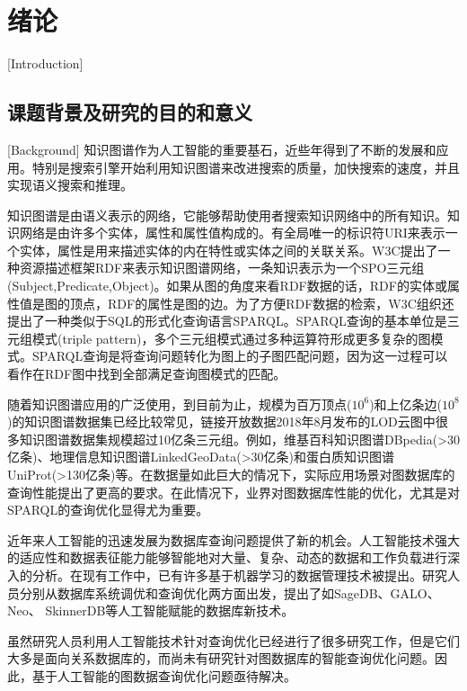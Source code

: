 
\chapter{绪论}[Introduction]

\section{课题背景及研究的目的和意义}[Background]
知识图谱作为人工智能的重要基石，近些年得到了不断的发展和应用。特别是搜索引擎开始利用知识图谱来改进搜索的质量，加快搜索的速度，并且实现语义搜索和推理。

知识图谱是由语义表示的网络，它能够帮助使用者搜索知识网络中的所有知识。知识网络是由许多个实体，属性和属性值构成的。有全局唯一的标识符URI来表示一个实体，属性是用来描述实体的内在特性或实体之间的关联关系。W3C提出了一种资源描述框架RDF\cite{rdf}来表示知识图谱网络，一条知识表示为一个SPO三元组(Subject,Predicate,Object)。如果从图的角度来看RDF数据的话，RDF的实体或属性值是图的顶点，RDF的属性是图的边。为了方便RDF数据的检索，W3C组织还提出了一种类似于SQL的形式化查询语言SPARQL\cite{sparql}。SPARQL查询的基本单位是三元组模式(triple pattern)，多个三元组模式通过多种运算符形成更多复杂的图模式。SPARQL查询是将查询问题转化为图上的子图匹配问题，因为这一过程可以看作在RDF图中找到全部满足查询图模式的匹配。

随着知识图谱应用的广泛使用，到目前为止，规模为百万顶点($10^6$)和上亿条边($10^8$)的知识图谱数据集已经比较常见\cite{MassiveData}，链接开放数据2018年8月发布的LOD云图中很多知识图谱数据集规模超过10亿条三元组。例如，维基百科知识图谱DBpedia(>30亿条)、地理信息知识图谱LinkedGeoData(>30亿条)和蛋白质知识图谱UniProt(>130亿条)等。在数据量如此巨大的情况下，实际应用场景对图数据库的查询性能提出了更高的要求。在此情况下，业界对图数据库性能的优化，尤其是对SPARQL的查询优化显得尤为重要。

近年来人工智能的迅速发展为数据库查询问题提供了新的机会\cite{MLforDB}。人工智能技术强大的适应性和数据表征能力能够智能地对大量、复杂、动态的数据和工作负载进行深入的分析。在现有工作中，已有许多基于机器学习的数据管理技术被提出。研究人员分别从数据库系统调优和查询优化两方面出发，提出了如SageDB\cite{SageDB}、GALO\cite{GALO}、Neo\cite{Neo}、
SkinnerDB\cite{SkinnerDB}等人工智能赋能的数据库新技术。

虽然研究人员利用人工智能技术针对查询优化已经进行了很多研究工作，但是它们大多是面向关系数据库的，而尚未有研究针对图数据库的智能查询优化问题。因此，基于人工智能的图数据查询优化问题亟待解决。

